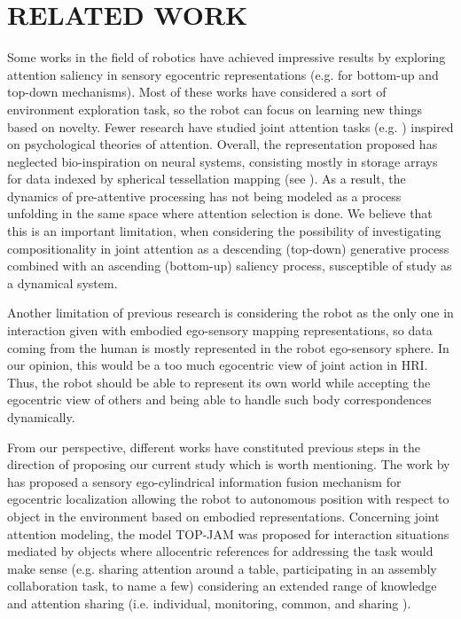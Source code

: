 \documentclass[letterpaper, 10 pt, conference]{ieeeconf}  %
\begin{document}
	\section{RELATED WORK}

	Some works in the field of robotics have achieved impressive results by exploring attention saliency in sensory egocentric representations (e.g. for bottom-up \cite{ruesch2008} and top-down \cite{bodiroza2011} mechanisms). Most of these works have considered a sort of environment exploration task, so the robot can focus on learning new things based on novelty. Fewer research have studied joint attention tasks (e.g. \cite{bodiroza2011}) inspired on psychological theories of attention. Overall, the representation proposed has neglected bio-inspiration on neural systems, consisting mostly in storage arrays for data indexed by spherical tessellation mapping (see \cite{peters2009sensory}). As a result, the dynamics of pre-attentive processing has not being modeled as a process unfolding in the same space where attention selection is done. We believe that this is an important limitation, when considering the possibility of investigating compositionality in joint attention as a descending (top-down) generative process combined with an ascending (bottom-up) saliency process, susceptible of study as a dynamical system.   
	
	Another limitation of previous research is considering the robot as the only one in interaction given with embodied ego-sensory mapping representations, so data coming from the human is mostly represented in the robot ego-sensory sphere. In our opinion, this would be a too much egocentric view of joint action in HRI. Thus, the robot should be able to represent its own world while accepting the egocentric view of others and being able to handle such body correspondences dynamically. 
	 
	From our perspective, different works have constituted previous steps in the direction of proposing our current study which is worth mentioning. The work by \cite{chame2016} has proposed a sensory ego-cylindrical information fusion mechanism for egocentric localization allowing the robot to autonomous position with respect to object in the environment based on embodied representations. Concerning joint attention modeling, the model TOP-JAM \cite{chame2023top} was proposed for interaction situations mediated by objects where allocentric references for addressing the task would make sense (e.g. sharing attention around a table, participating in an assembly collaboration task, to name a few) considering an extended range of knowledge and attention sharing (i.e. individual, monitoring, common, and sharing \cite{siposova2019}). 
	 
\end{document}
